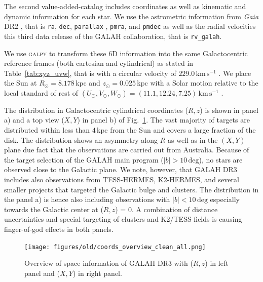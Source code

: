 \documentclass[fleqn,usenatbib,useAMS]{mnras}
\newcommand{\Gaia}{\textit{Gaia}\xspace}
\begin{document}
The second value-added-catalog includes coordinates as well as kinematic and dynamic information for each star. We use the astrometric information from \Gaia DR2 \citep{Brown2018}, that is \texttt{ra}, \texttt{dec}, \texttt{parallax} \citep[converted into distances by][]{BailerJones2018}, \texttt{pmra}, and \texttt{pmdec} as well as the radial velocities this third data release of the GALAH collaboration, that is  \texttt{rv\_galah}.

We use \textsc{galpy} \citep{Bovy2015} to transform these 6D information into the same Galactocentric reference frames (both cartesian and cylindrical) as stated in Table~\ref{tab:xyz_uvw}, that is with a circular velocity of $229.0\,\mathrm{km\,s^{-1}}$ \citep{Eilers2019}. We place the Sun at $R_\odot = 8.178\,\mathrm{kpc}$ \citep{Abuter2019} and $z_\odot = 0.025\,\mathrm{kpc}$ \citep{Juric2008} with a Solar motion relative to the local standard of rest of $(U_\odot,V_\odot,W_\odot) = (11.1, 12.24, 7.25)\,\mathrm{km\,s^{-1}}$ \citep{Schoenrich2010}.

The distribution in Galactocentric cylindrical coordinates ($R,z$) is shown in panel a) and a top view ($X,Y$) in panel b) of Fig.~\ref{fig:coords_overview}. The vast majority of targets are distributed within less than $4\,\mathrm{kpc}$ from the Sun and covers a large fraction of the disk. The distribution shows an asymmetry along $R$ as well as in the $(X,Y)$ plane due fact that the observations are carried out from Australia. Because of the target selection of the GALAH main program ($\vert b \vert > 10\,\mathrm{deg}$), no stars are observed close to the Galactic plane. We note, however, that GALAH DR3 includes also observations from TESS-HERMES, K2-HERMES, and several smaller projects that targeted the Galactic bulge and clusters. The distribution in the panel a) is hence also including observations with $\vert b \vert < 10\,\mathrm{deg}$ especially towards the Galactic center at ($R,z$) = 0. A combination of distance uncertainties and special targeting of clusters and K2/TESS fields is causing finger-of-god effects in both panels.

\begin{figure}
\centering
\texttt{[image: figures/old/coords\_overview\_clean\_all.png]}
  \caption[{Overview of space information of GALAH DR3 with ($R,z$) in left panel and ($X,Y$) in right panel.}]{Overview of space information of GALAH DR3 with ($R,z$) in left panel and ($X,Y$) in right panel.}
  \label{fig:coords_overview}
\end{figure}
\end{document}
